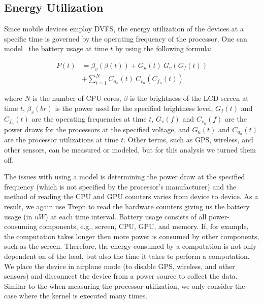 \subsection{Energy Utilization}


Since mobile devices employ DVFS,
  the energy utilization of the devices at a specific time is governed by
  the operating frequency of the processor.
One can model~\cite{zhang2010accurate, dong2011self} the battery usage
at time $t$ by using the following formula:

\begin{align*}
P(t) &= \beta_v(\beta(t)) + G_u(t) ~ G_v(G_f(t)) \\
     &+ \sum_{i=1}^{N} C_{u_n}(t) ~ C_{v_n}(C_{f_n}(t))
\end{align*}

where $N$ is the number of CPU cores, $\beta$ is the brightness of the LCD screen at time $t$, $\beta_v(br)$ is the power used for the specified brightness level, $G_f(t)$ and $C_{f_n}(t)$ are the operating frequencies at time $t$, $G_v(f)$ and $ C_{v_n}(f)$ are the power draws for the processors at the specified voltage, and $G_u(t)$ and $C_{u_n}(t)$ are the processor utilizations at time $t$.
Other terms, such as GPS, wireless, and other sensors, can be measured or modeled, but for this analysis we turned them off.

The issues with using a model is determining the power draw at the specified
  frequency (which is not specified by the processor's manufacturer) and the method of reading
  the CPU and GPU counters varies from device to device.
As a result, we again use Trepn to read the hardware counters giving us the battery usage (in $uW$) at each time interval.
Battery usage consists of all power-consuming components, e.g., screen, CPU, GPU, and memory.
If, for example, the computation takes longer then more power is consumed by other components, such as the screen.
Therefore, the energy consumed by a computation is not only dependent on of the load, but also the time it takes to perform a computation.
We place the device in airplane mode (to disable GPS, wireless, and other sensors) and disconnect the device from a power source to 
  collect the data.
Similar to the when measuring the processor utilization, we only consider the case where the kernel is executed many times.


